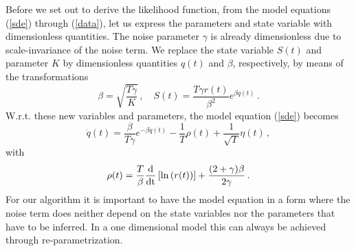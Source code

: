 \documentclass[12pt,a4paper,final]{iopart}
\begin{document}
Before we set out to derive the likelihood function, from the model equations (\ref{sde}) through (\ref{data}), let us express the parameters and state variable with dimensionless quantities.
The noise parameter $\gamma$ is already dimensionless due to scale-invariance of the noise term.
We replace the state variable $S(t)$ and parameter $K$ by dimensionless quantities $q(t)$ and $\beta$, respectively, by means of the transformations
\begin{equation}
  \beta=\sqrt{\frac{T\gamma}{K}}\,,\quad
  S(t)=\frac{T\gamma r(t)}{\beta^2}e^{\beta q(t)}\,.
\end{equation}
W.r.t. these new  variables and parameters, the model equation (\ref{sde}) becomes
\begin{equation}
  \dot q(t)
  =
  \frac{\beta}{T\gamma}e^{-\beta q(t)}
  -
  \frac{1}{T}\rho(t)
  +
  \frac{1}{\sqrt{T}}\eta(t)\,,
\end{equation}
with
\begin{equation}
  \rho(t)
  =
  \frac{T}{\beta}\frac{\mbox d}{\mbox{dt}}\left[ \ln \left( r(t) \right) \right]
  +
  \frac{(2+\gamma)\beta}{2\gamma}\,.
\end{equation}
For our algorithm it is important to have the model equation in a form where the noise term does neither depend on the state variables nor the parameters that have to be inferred. In a one dimensional model this can always be achieved through re-parametrization.
\end{document}
